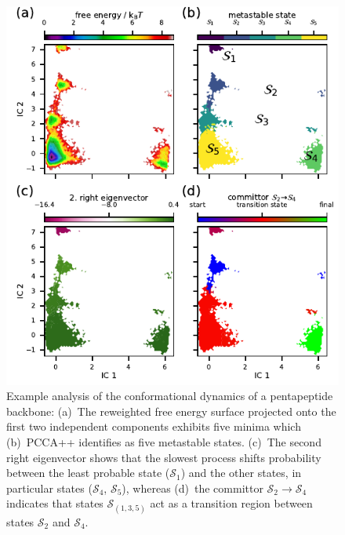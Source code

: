 \documentclass[9pt,tutorial]{livecoms}
\begin{document}
\begin{figure}
\includegraphics{figure_5}
\caption{Example analysis of the conformational dynamics of a pentapeptide backbone:
(a)~The reweighted free energy surface projected onto the first two independent components exhibits five minima which
(b)~PCCA++ identifies as five metastable states.
(c)~The second right eigenvector shows that the slowest process shifts probability between the least probable state ($\mathcal{S}_1$) and the other states,
in particular states ($\mathcal{S}_4$, $\mathcal{S}_5$), whereas
(d)~the committor $\mathcal{S}_2\to\mathcal{S}_4$ indicates that states $\mathcal{S}_{(1,3,5)}$ act as a transition region between states $\mathcal{S}_2$ and $\mathcal{S}_4$.}
\label{fig:msm-analysis}
\end{figure}
\end{document}
